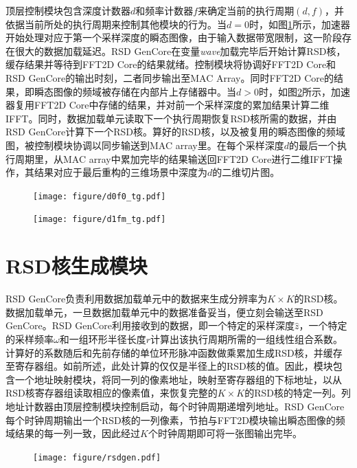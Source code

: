 \documentclass[master]{shtthesis}             %
\begin{document}
顶层控制模块包含深度计数器$d$和频率计数器$f$来确定当前的执行周期$(d,f)$，并依据当前所处的执行周期来控制其他模块的行为。当$d=0$时，如图\ref{fig:tg_d0}所示，加速器开始处理对应于第一个采样深度的瞬态图像，由于输入数据带宽限制，这一阶段存在很大的数据加载延迟。RSD GenCore在变量\textit{wave}加载完毕后开始计算RSD核，缓存结果并等待到FFT2D Core的结果就绪。控制模块将协调好FFT2D Core和RSD GenCore的输出时刻，二者同步输出至MAC Array。同时FFT2D Core的结果，即瞬态图像的频域被存储在内部片上存储器中。当$d>0$时，如图\ref{fig:tg_d1}所示，加速器复用FFT2D Core中存储的结果，并对前一个采样深度的累加结果计算二维IFFT。同时，数据加载单元读取下一个执行周期恢复RSD核所需的数据，并由RSD GenCore计算下一个RSD核。算好的RSD核，以及被复用的瞬态图像的频域图，被控制模块协调以同步输送到MAC array里。在每个采样深度$d$的最后一个执行周期里，从MAC array中累加完毕的结果输送回FFT2D Core进行二维IFFT操作，其结果对应于最后重构的三维场景中深度为$d$的二维切片图。
\begin{figure}[!tb]
    \centering
    \texttt{[image: figure/d0f0\_tg.pdf]}
    \label{fig:tg_d0}
\end{figure}
\begin{figure}[!tb]
    \centering
    \texttt{[image: figure/d1fm\_tg.pdf]}
    \label{fig:tg_d1}
\end{figure}

\section{RSD核生成模块}

RSD GenCore负责利用数据加载单元中的数据来生成分辨率为$K\times K$的RSD核。数据加载单元，一旦数据加载单元中的数据准备妥当，便立刻会输送至RSD GenCore。RSD GenCore利用接收到的数据，即一个特定的采样深度$\hat{z}$，一个特定的采样频率$\omega$和一组环形半径长度$r$计算出该执行周期所需的一组线性组合系数。计算好的系数随后和先前存储的单位环形脉冲函数做乘累加生成RSD核，并缓存至寄存器组。如前所述，此处计算的仅仅是半径上的RSD核的值。因此，模块包含一个地址映射模块，将同一列的像素地址，映射至寄存器组的下标地址，以从RSD核寄存器组读取相应的像素值，来恢复完整的$K\times K$的RSD核的特定一列。列地址计数器由顶层控制模块控制启动，每个时钟周期递增列地址。RSD GenCore每个时钟周期输出一个RSD核的一列像素，节拍与FFT2D模块输出瞬态图像的频域结果的每一列一致，因此经过$K$个时钟周期即可将一张图输出完毕。

\begin{figure}[!tb]
    \centering
    \texttt{[image: figure/rsdgen.pdf]}
    \label{fig:rkg}
\end{figure}
\end{document}
